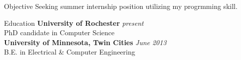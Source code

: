 \documentclass{resume} %
\begin{document}
\begin{rSection}{Objective}
Seeking summer internship position utilizing my progrmming skill.  
\end{rSection}



\begin{rSection}{Education}
{\bf University of Rochester} \hfill {\em present}\\
PhD candidate in Computer Science \\ 
{\bf University of Minnesota, Twin Cities} \hfill {\em June 2013} \\ 
B.E. in Electrical \& Computer Engineering
\end{rSection}

\end{document}
